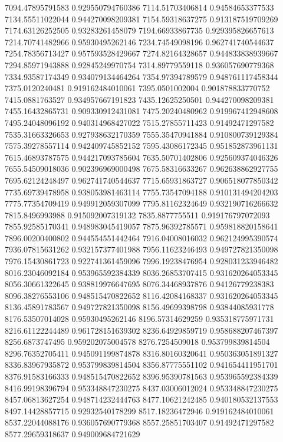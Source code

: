 {7094.47895791583 0.929550794760386
7114.51703406814 0.94584653377533
7134.55511022044 0.944270098209381
7154.59318637275 0.913187519709269
7174.63126252505 0.93283261458079
7194.66933867735 0.929395826657613
7214.70741482966 0.95930495262146
7234.74549098196 0.962741740544637
7254.78356713427 0.957593528429667
7274.82164328657 0.944833838939667
7294.85971943888 0.92845249970754
7314.89779559118 0.936057690779368
7334.93587174349 0.934079134464264
7354.97394789579 0.948761117458344
7375.0120240481 0.919162484010061
7395.0501002004 0.901878833770752
7415.0881763527 0.934957667191823
7435.12625250501 0.944270098209381
7455.16432865731 0.909330912431081
7475.20240480962 0.919967412948608
7495.24048096192 0.940314968427022
7515.27855711423 0.91492471297582
7535.31663326653 0.927938632170359
7555.35470941884 0.910800739129384
7575.39278557114 0.942409745852152
7595.43086172345 0.951852873961131
7615.46893787575 0.944217093785604
7635.50701402806 0.925609374046326
7655.54509018036 0.902396969000498
7675.58316633267 0.962638862927755
7695.62124248497 0.962741740544637
7715.65931863727 0.906518077850342
7735.69739478958 0.938053981463114
7755.73547094188 0.910131494204203
7775.77354709419 0.949912059307099
7795.81162324649 0.932190716266632
7815.8496993988 0.915092007319132
7835.8877755511 0.919176797072093
7855.92585170341 0.948983045419057
7875.96392785571 0.959818820158641
7896.00200400802 0.944554551442464
7916.04008016032 0.962124995390574
7936.07815631262 0.932157377401988
7956.11623246493 0.949727821350098
7976.15430861723 0.922741361459096
7996.19238476954 0.928031233946482
8016.23046092184 0.953965592384339
8036.26853707415 0.931620264053345
8056.30661322645 0.938819976647695
8076.34468937876 0.94126779238383
8096.38276553106 0.948515470822652
8116.42084168337 0.931620264053345
8136.45891783567 0.949727821350098
8156.49699398798 0.93844085931778
8176.53507014028 0.95930495262146
8196.57314629259 0.935318775971731
8216.61122244489 0.961728151639302
8236.64929859719 0.958688207467397
8256.6873747495 0.959202075004578
8276.7254509018 0.953799839814504
8296.76352705411 0.945091199874878
8316.80160320641 0.950363051891327
8336.83967935872 0.953799839814504
8356.87775551102 0.941654411951701
8376.91583166333 0.948515470822652
8396.95390781563 0.953965592384339
8416.99198396794 0.953348847230275
8437.03006012024 0.953348847230275
8457.06813627254 0.948714232444763
8477.10621242485 0.940180532137553
8497.14428857715 0.92932540178299
8517.18236472946 0.919162484010061
8537.22044088176 0.936057690779368
8557.25851703407 0.91492471297582
8577.29659318637 0.949009684721629
}
